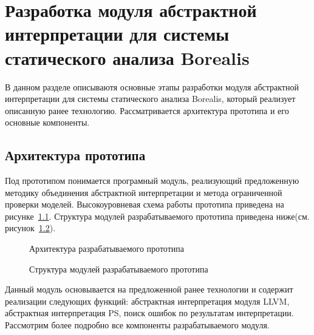 \chapter{Разработка модуля абстрактной интерпретации для системы статического
анализа Borealis}
\label{chapter:implementation}
В данном разделе описываютя основные этапы разработки модуля абстрактной 
интерпретации для системы статического анализа Borealis, который реализует
описанную ранее технологию. Рассматривается архитектура прототипа и его
основные компоненты.

\section{Архитектура прототипа}
Под прототипом понимается програмный модуль, реализующий предложенную методику
объединения абстрактной интерпретации и метода ограниченной проверки моделей.
Высокоуровневая схема работы прототипа приведена на 
рисунке~\ref{image:NewBorealisOverview}. Структура модулей разрабатываемого прототипа приведена ниже(см. рисунок~\ref{image:prototypeArchitecture}).
\begin{figure}[h!]
\caption{Архитектура разрабатываемого прототипа}
\label{image:NewBorealisOverview}
\end{figure}
\begin{figure}[h!]
\caption{Структура модулей разрабатываемого прототипа}
\label{image:prototypeArchitecture}
\end{figure}

Данный модуль основывается на предложенной ранее технологии и содержит реализации
следующих функций: абстрактная интерпретация модуля LLVM, абстрактная 
интерпретация PS, поиск ошибок по результатам интерпретации. Рассмотрим более
подробно все компоненты разрабатываемого модуля.

